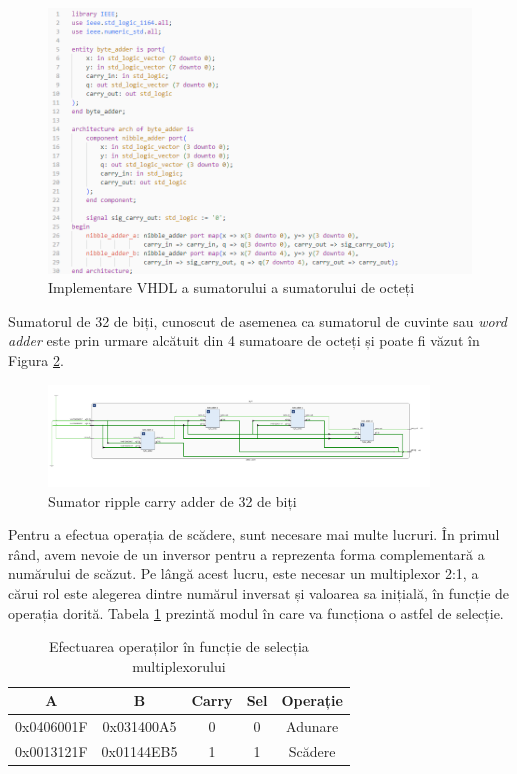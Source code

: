 \documentclass[12pt]{article}
\begin{document}
 \begin{figure}[h!]
 \includegraphics[width=1.0\textwidth]{byteadderVHDL.png}
 \centering
 \caption{Implementare VHDL a sumatorului a sumatorului de octeți}
 \label{Figura:26}
 \end{figure}
 
Sumatorul de 32 de biți, cunoscut de asemenea ca sumatorul de cuvinte sau \textit{word adder} este prin urmare alcătuit din 4 sumatoare de octeți și poate fi văzut în Figura \ref{Figura:18}.

 \begin{figure}[h!]
 \includegraphics[width=0.9\textwidth]{32bitadder.png}
 \centering
 \caption{Sumator ripple carry adder de 32 de biți}
 \label{Figura:18}
 \end{figure}
 
Pentru a efectua operația de scădere, sunt necesare mai multe lucruri. În primul rând, avem nevoie de un inversor pentru a reprezenta forma complementară a numărului de scăzut. Pe lângă acest lucru, este necesar un multiplexor 2:1, a cărui rol este alegerea dintre numărul inversat și valoarea sa inițială, în funcție de operația dorită. Tabela \ref{Tabela:13} prezintă modul în care va funcționa o astfel de selecție.

\newpage
\begin{table}[h]
\centering
\begin{tabular}{ ||c|c|c|c|c|| }
 \hline
 A & B & Carry & Sel & Operație\\ 
 \hline  \hline
 0x0406001F & 0x031400A5 & 0 & 0 & Adunare \\
 \hline
 0x0013121F & 0x01144EB5 & 1 & 1 & Scădere \\
 
  \hline  
\end{tabular}
\caption{Efectuarea operaților în funcție de selecția multiplexorului}
\label{Tabela:13}
\end{table}
\end{document}
